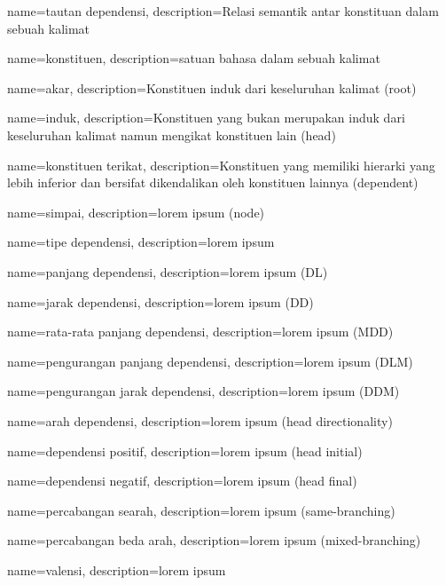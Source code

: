 {
    name=tautan dependensi,
    description={Relasi semantik antar konstituan dalam sebuah kalimat}
}

{
    name=konstituen,
    description={satuan bahasa dalam sebuah kalimat}
}

{
    name=akar,
    description={Konstituen induk dari keseluruhan kalimat (root)}
}

{
    name=induk,
    description={Konstituen yang bukan merupakan induk dari keseluruhan kalimat namun mengikat konstituen lain (head)}
}

{
    name=konstituen terikat,
    description={Konstituen yang  memiliki hierarki yang lebih inferior dan bersifat dikendalikan oleh konstituen lainnya (dependent)}
}

{
    name=simpai,
    description={lorem ipsum (node)}
}

{
    name=tipe dependensi,
    description={lorem ipsum}
}

{
    name=panjang dependensi,
    description={lorem ipsum (DL)}
}

{
    name=jarak dependensi,
    description={lorem ipsum (DD)}
}

{
    name=rata-rata panjang dependensi,
    description={lorem ipsum (MDD)}
}

{
    name=pengurangan panjang dependensi,
    description={lorem ipsum (DLM)}
}

{
    name=pengurangan jarak dependensi,
    description={lorem ipsum (DDM)}
}

{
    name=arah dependensi,
    description={lorem ipsum (head directionality)}
}

{
    name=dependensi positif,
    description={lorem ipsum (head initial)}
}

{
    name=dependensi negatif,
    description={lorem ipsum (head final)}
}

{
    name=percabangan searah,
    description={lorem ipsum (same-branching)}
}

{
    name=percabangan beda arah,
    description={lorem ipsum (mixed-branching)}
}

{
    name=valensi,
    description={lorem ipsum}
}